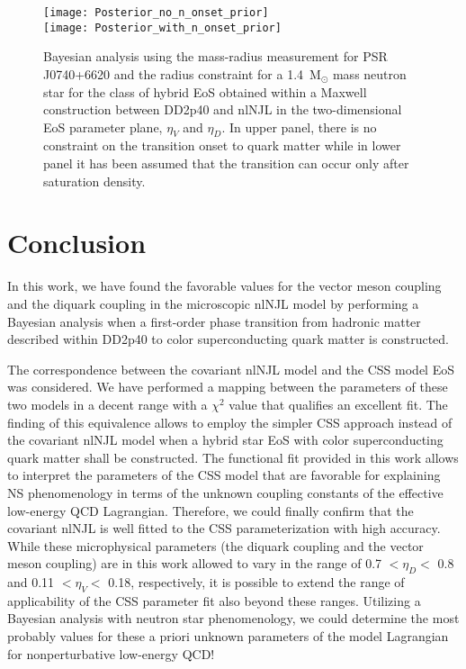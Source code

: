 \documentclass[%
 reprint,
superscriptaddress,
nofootinbib,
 amsmath,amssymb,
 aps,
]{revtex4-1}
\begin{document}
\begin{figure}[h]
    \texttt{[image: Posterior\_no\_n\_onset\_prior]}\\
    \texttt{[image: Posterior\_with\_n\_onset\_prior]}
    \caption{Bayesian analysis using the mass-radius measurement for PSR J0740+6620 and the radius constraint for a 1.4~M$_{\odot}$ mass neutron star for the class of hybrid EoS
obtained within a Maxwell construction between DD2p40 and nlNJL in the two-dimensional EoS parameter plane, $\eta_V$
and $\eta_D$. In upper panel, there is no constraint on the transition onset to quark matter while in lower panel it has been assumed that the transition can occur only after saturation density.}
    \label{fig:Bayasian}
\end{figure}


\section{Conclusion} 
\label{sec:conslusion}
{In this work, we have found the favorable values for the vector meson coupling and the diquark coupling in the microscopic nlNJL model by performing a Bayesian analysis when a first-order phase transition from hadronic matter described within DD2p40 to color superconducting quark matter is constructed.}

The correspondence between the covariant nlNJL model and the CSS model EoS was considered. 
We have performed a mapping between the parameters of these two models in a decent range with a $\chi^2$ value that qualifies an excellent fit.
The finding of this equivalence allows to employ the simpler CSS approach instead of the covariant nlNJL model when a hybrid star EoS with color superconducting quark matter shall be constructed. 
The functional fit provided in this work allows to interpret the parameters of the CSS model that are favorable for explaining NS phenomenology in terms of the unknown coupling constants of the effective low-energy QCD Lagrangian. 
Therefore, we could finally confirm that the covariant nlNJL is well fitted to the CSS parameterization with high accuracy. 
While these microphysical parameters (the diquark coupling and the vector meson coupling) are in this work allowed to vary in the range of 0.7 $< \eta_D <$ 0.8 and 0.11 $< \eta_V <$ 0.18, respectively, it is possible to extend the range of applicability of the CSS parameter fit also beyond these ranges. 
Utilizing a Bayesian analysis with neutron star phenomenology, we could determine the most probably values for these a priori unknown parameters of the model Lagrangian for nonperturbative low-energy QCD! 
\end{document}
